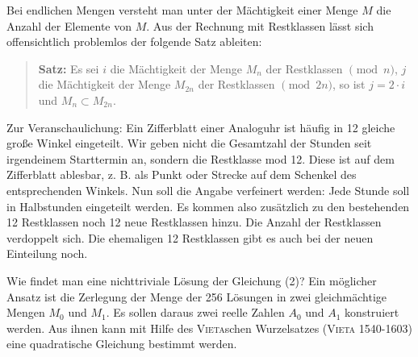 \documentclass[11pt]{article}
\begin{document}
Bei endlichen Mengen versteht man unter der Mächtigkeit einer Menge $M$ die
Anzahl der Elemente von $M$. Aus der Rechnung mit Restklassen lässt sich
offensichtlich problemlos der folgende Satz ableiten:
\begin{quote}
  \textbf{Satz:} Es sei $i$ die Mächtigkeit der Menge $M_n$ der Restklassen
  $\pmod{n}$, $j$ die Mächtigkeit der Menge $M_{2n}$ der Restklassen
  $\pmod{2n}$, so ist $j = 2 \cdot i$ und $M_n \subset M_{2n}$.
\end{quote}
Zur Veranschaulichung: Ein Zifferblatt einer Analoguhr ist häufig in 12
gleiche große Winkel eingeteilt. Wir geben nicht die Gesamtzahl der Stunden
seit irgendeinem Starttermin an, sondern die Restklasse mod 12. Diese ist auf
dem Zifferblatt ablesbar, z. B. als Punkt oder Strecke auf dem Schenkel des
entsprechenden Winkels. Nun soll die Angabe verfeinert werden: Jede Stunde
soll in Halbstunden eingeteilt werden. Es kommen also zusätzlich zu den
bestehenden 12 Restklassen noch 12 neue Restklassen hinzu. Die Anzahl der
Restklassen verdoppelt sich. Die ehemaligen 12 Restklassen gibt es auch bei
der neuen Einteilung noch.

Wie findet man eine nichttriviale Lösung der Gleichung (2)?  Ein möglicher
Ansatz ist die Zerlegung der Menge der 256 Lösungen in zwei gleichmächtige
Mengen $M_0$ und $M_1$. Es sollen daraus zwei reelle Zahlen $A_0$ und $A_1$
konstruiert werden. Aus ihnen kann mit Hilfe des \textsc{Vieta}schen
Wurzelsatzes (\textsc{Vieta} 1540-1603) eine quadratische Gleichung bestimmt
werden.
\end{document}
